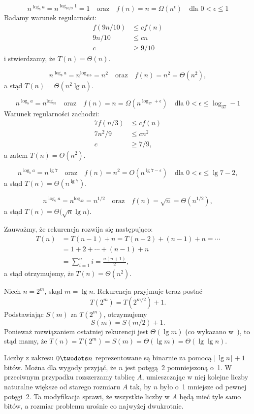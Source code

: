 \subexercise{} %
\[
	n^{\log_ba} = n^{\log_{10/9}1} = 1 \quad\text{oraz}\quad f(n) = n = \Omega(n^\epsilon) \quad\text{dla $0<\epsilon\le1$}
\]
Badamy warunek regularności:
\begin{align*}
	f(9n/10) &\le cf(n) \\
	9n/10 &\le cn \\
	c &\ge 9/10
\end{align*}
i stwierdzamy, że $T(n)=\Theta(n)$.

\subexercise{} %
\[
	n^{\log_ba} = n^{\log_416} = n^2 \quad\text{oraz}\quad f(n) = n^2 = \Theta(n^2),
\]
a stąd $T(n)=\Theta(n^2\lg n)$.

\subexercise{} %
\[
	n^{\log_ba} = n^{\log_37} \quad\text{oraz}\quad f(n) = n = \Omega(n^{\log_37+\epsilon}) \quad\text{dla $0<\epsilon\le\log_37-1$}
\]
Warunek regularności zachodzi:
\begin{align*}
	7f(n/3) &\le cf(n) \\
	7n^2\!/9 &\le cn^2 \\
	c &\ge 7/9,
\end{align*}
a zatem $T(n)=\Theta(n^2)$.

\subexercise{} %
\[
	n^{\log_ba} = n^{\lg7} \quad\text{oraz}\quad f(n) = n^2 = O(n^{\lg7-\epsilon}) \quad\text{dla $0<\epsilon\le\lg7-2$},
\]
a stąd $T(n)=\Theta(n^{\lg7})$.

\subexercise{} %
\[
	n^{\log_ba} = n^{\log_42} = n^{1/2} \quad\text{oraz}\quad f(n) = \sqrt{n} = \Theta(n^{1/2}),
\]
a stąd $T(n)=\Theta\bigl(\!\sqrt{n}\lg n\bigr)$.

\subexercise{} %
Zauważmy, że rekurencja rozwija się następująco:
\begin{align*}
	T(n) &= T(n-1)+n = T(n-2)+(n-1)+n = \cdots \\
	&= 1+2+\cdots+(n-1)+n \\
	&= \sum_{i=1}^ni = \frac{n(n+1)}{2},
\end{align*}
a stąd otrzymujemy, że $T(n)=\Theta(n^2)$.

\subexercise{} %
Niech $n=2^m$, skąd $m=\lg n$. Rekurencja przyjmuje teraz postać
\[
	T(2^m) = T(2^{m/2})+1.
\]
Podstawiając $S(m)$ za $T(2^m)$, otrzymujemy
\[
	S(m) = S(m/2)+1.
\]
Ponieważ rozwiązaniem ostatniej rekurencji jest $\Theta(\lg m)$ (co wykazano w~), to stąd mamy, że $T(n)=T(2^m)=S(m)=\Theta(\lg m)=\Theta(\lg\lg n)$.

\noindent Liczby z zakresu $0\twodots n$ reprezentowane są binarnie za pomocą $\lfloor\lg n\rfloor+1$ bitów. Można dla wygody przyjąć, że $n$ jest potęgą~2 pomniejszoną o~1. W przeciwnym przypadku rozszerzamy tablicę $A$, umieszczając w niej kolejne liczby naturalne większe od starego rozmiaru $A$ tak, by $n$ było o~1 mniejsze od pewnej potęgi~2. Ta modyfikacja sprawi, że wszystkie liczby w $A$ będą mieć tyle samo bitów, a rozmiar problemu urośnie co najwyżej dwukrotnie.

